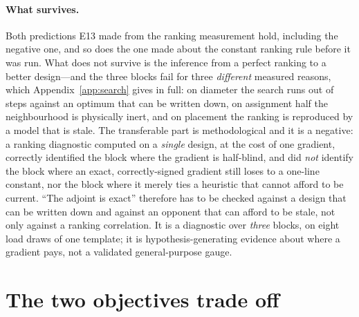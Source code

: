 \documentclass{article}
\begin{document}
\paragraph{What survives.}
Both predictions E13 made from the ranking measurement hold, including the negative one, and so
does the one made about the constant ranking rule before it was run.  What does not survive is
the inference from a perfect ranking to a better design---and the three blocks fail for three
\emph{different} measured reasons, which Appendix~\ref{app:search} gives in full: on diameter the
search runs out of steps against an optimum that can be written down, on assignment half the
neighbourhood is physically inert, and on placement the ranking is reproduced by a model that is
stale.  The transferable part is methodological and it is a negative: a ranking diagnostic
computed on a \emph{single} design, at the cost of one gradient, correctly identified the block
where the gradient is half-blind, and did \emph{not} identify the block where an exact,
correctly-signed gradient still loses to a one-line constant, nor the block where it merely ties
a heuristic that cannot afford to be current.  ``The adjoint is exact'' therefore has to be
checked against a design that can be written down and against an opponent that can afford to be
stale, not only against a ranking correlation.  It is a diagnostic over \emph{three} blocks, on
eight load draws of one template; it is hypothesis-generating evidence about where a gradient
pays, not a validated general-purpose gauge.

\section{The two objectives trade off}
\label{sec:tradeoff}
\end{document}
